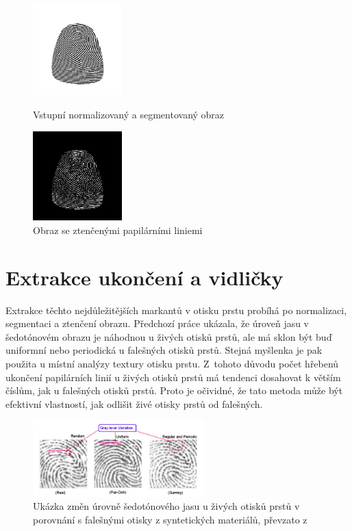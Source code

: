 \begin{figure}[htbp]
  \begin{minipage}[b]{0.5\linewidth}
    \centering
    \includegraphics[width=130px]{obrazky-figures/SG_LLnorm.png}
    \caption{Vstupní normalizovaný a segmentovaný obraz}
  \end{minipage}
  \hspace{0.5cm}
  \begin{minipage}[b]{0.5\linewidth}
    \centering
    \includegraphics[width=130px]{obrazky-figures/SG_LLthin.png}
    \caption{Obraz se ztenčenými papilárními liniemi}
  \end{minipage}
\end{figure}
\section{Extrakce ukončení a vidličky}
Extrakce těchto nejdůležitějších markantů v otisku prstu probíhá po normalizaci, segmentaci a ztenčení obrazu. Předchozí práce ukázala, že úroveň jasu v šedotónovém obrazu je náhodnou u živých otisků prstů, ale má sklon být buď uniformní nebo periodická u falešných otisků prstů. Stejná myšlenka je pak použita u místní analýzy textury otisku prstu. Z~tohoto důvodu počet hřebenů ukončení papilárních linií u živých otisků prstů má tendenci dosahovat k větším číslům, jak u falešných otisků prstů. Proto je očividné, že tato metoda může být efektivní vlastností, jak odlišit živé otisky prstů od falešných.\cite{AbhiskekStudy}

\begin{figure}[htbp]
    \centering
    \includegraphics[width=250px]{obrazky-figures/graylevel.png}
    \caption{Ukázka změn úrovně šedotónového jasu u živých otisků prstů v porovnání s falešnými otisky z syntetických materiálů, převzato z \cite{AbhiskekStudy}}
\end{figure}

